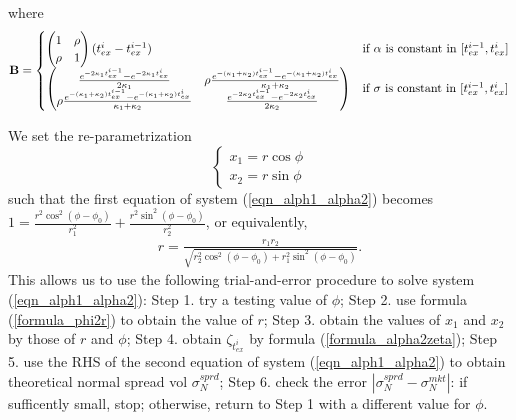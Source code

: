 \documentclass[10pt]{article}
\theoremstyle{plain}
\numberwithin{equation}{section}
\numberwithin{table}{section}
\begin{document}
where
\[
{\bf B} =
\begin{cases}
\left( \begin{matrix}1 & \rho  \\ \rho & 1\end{matrix}
\right)(t_{ex}^i-t_{ex}^{i-1}) & \mbox{if $\alpha$ is constant in
$[t_{ex}^{i-1},t_{ex}^i]$} \\
\left(\begin{matrix} \frac{e^{-2\kappa_1
t_{ex}^{i-1}}-e^{-2\kappa_1t_{ex}^i}}{2\kappa_1} & \rho
\frac{e^{-(\kappa_1+\kappa_2)t_{ex}^{i-1}} -
e^{-(\kappa_1+\kappa_2)t_{ex}^i}}{\kappa_1+\kappa_2} \\ \rho
\frac{e^{-(\kappa_1+\kappa_2)t_{ex}^{i-1}} -
e^{-(\kappa_1+\kappa_2)t_{ex}^i}}{\kappa_1+\kappa_2} &
\frac{e^{-2\kappa_2t_{ex}^{i-1}}-e^{-2\kappa_2t_{ex}^i}}{2\kappa_2}
\end{matrix} \right) & \mbox{if $\sigma$ is constant in
$[t_{ex}^{i-1},t_{ex}^i]$}
\end{cases}
\]

We set the re-parametrization
\[
\begin{cases}
x_1 = r\cos\phi \\
x_2 = r\sin\phi
\end{cases}
\]
such that the first equation of system (\ref{eqn_alph1_alpha2}) becomes
$1 = \frac{r^2 \cos^2(\phi-\phi_0)}{r_1^2} +
\frac{r^2\sin^2(\phi-\phi_0)}{r_2^2}$, or equivalently,
\begin{eqnarray}\label{formula_phi2r}
r = \frac{r_1r_2}{\sqrt{r_2^2\cos^2(\phi-\phi_0)+r_1^2\sin^2(\phi-\phi_0)}}.
\end{eqnarray}
This allows us to use the following trial-and-error procedure to solve
system (\ref{eqn_alph1_alpha2}):
\newline Step 1. try a testing value of $\phi$;
\newline Step 2. use formula (\ref{formula_phi2r}) to obtain the value of $r$;
\newline Step 3. obtain the values of $x_1$ and $x_2$ by those of $r$
and $\phi$;
\newline Step 4. obtain $\zeta_{t^i_{ex}}$ by formula
(\ref{formula_alpha2zeta});
\newline Step 5. use the RHS of the second equation of system
(\ref{eqn_alph1_alpha2}) to obtain theoretical normal spread vol
$\sigma_N^{sprd}$;
\newline Step 6. check the error $|\sigma_N^{sprd} - \sigma_N^{mkt}|$:
if sufficently small, stop; otherwise, return to Step 1 with a
different value for $\phi$.
\end{document}
